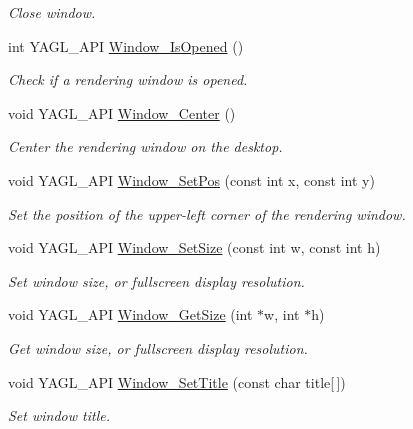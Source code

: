 \begin{DoxyCompactItemize}
\begin{DoxyCompactList}\small\item\em Close window. \end{DoxyCompactList}\item 
int Y\-A\-G\-L\-\_\-\-A\-P\-I \hyperlink{group____window_ga7f76a09d3deff66720752bf2a0923d4f}{Window\-\_\-\-Is\-Opened} ()
\begin{DoxyCompactList}\small\item\em Check if a rendering window is opened. \end{DoxyCompactList}\item 
void Y\-A\-G\-L\-\_\-\-A\-P\-I \hyperlink{group____window_ga7374ce0332c91678a678553a1cae0d0d}{Window\-\_\-\-Center} ()
\begin{DoxyCompactList}\small\item\em Center the rendering window on the desktop. \end{DoxyCompactList}\item 
void Y\-A\-G\-L\-\_\-\-A\-P\-I \hyperlink{group____window_ga32ea67ebad901a6153c8ceb61af5ce3a}{Window\-\_\-\-Set\-Pos} (const int x, const int y)
\begin{DoxyCompactList}\small\item\em Set the position of the upper-\/left corner of the rendering window. \end{DoxyCompactList}\item 
void Y\-A\-G\-L\-\_\-\-A\-P\-I \hyperlink{group____window_gac754a769c0175b881d6d681449b763f2}{Window\-\_\-\-Set\-Size} (const int w, const int h)
\begin{DoxyCompactList}\small\item\em Set window size, or fullscreen display resolution. \end{DoxyCompactList}\item 
void Y\-A\-G\-L\-\_\-\-A\-P\-I \hyperlink{group____window_ga142e4c04a7eae7868c5900b29f08f7e5}{Window\-\_\-\-Get\-Size} (int $\ast$w, int $\ast$h)
\begin{DoxyCompactList}\small\item\em Get window size, or fullscreen display resolution. \end{DoxyCompactList}\item 
void Y\-A\-G\-L\-\_\-\-A\-P\-I \hyperlink{group____window_ga67e07e415c971fe4951e571e2b391cf8}{Window\-\_\-\-Set\-Title} (const char title\mbox{[}$\,$\mbox{]})
\begin{DoxyCompactList}\small\item\em Set window title. \end{DoxyCompactList}\item 

\end{DoxyCompactItemize}
